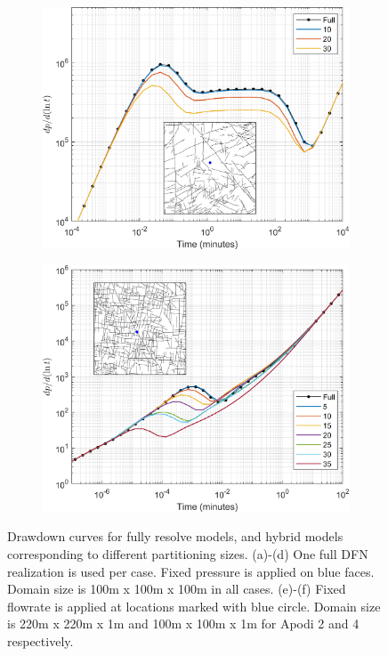 \documentclass[main.tex]{subfiles}
\begin{document}
\begin{figure}[ht]
\begin{subfigure}{0.3\textwidth}
			\label{fig:DD_D}
		\end{subfigure}
		\begin{subfigure}{0.3\textwidth}
			\includegraphics[width=\textwidth]{DD_main/Apodi2_matwell_BCinset.png}
			\label{fig:DD_A2}
		\end{subfigure}
		\begin{subfigure}{0.3\textwidth}
			\includegraphics[width=\textwidth]{DD_main/Apodi4_fracwell_BCinset.png}
			\label{fig:DD_A4}
		\end{subfigure}
		\caption{Drawdown curves for fully resolve models, and hybrid models corresponding to different partitioning sizes. (a)-(d) One full DFN realization is used per case. Fixed pressure is applied on blue faces. Domain size is 100m x 100m x 100m in all cases. (e)-(f) Fixed flowrate is applied at locations marked with blue circle. Domain size is 220m x 220m x 1m and 100m x 100m x 1m for Apodi 2 and 4 respectively.}
		\label{fig:DD}
	\end{figure}
	
	
	
\end{document}
